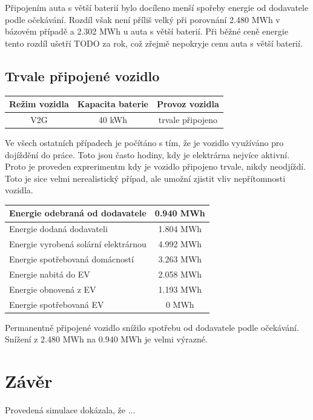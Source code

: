 \documentclass[12pt,a4paper]{article}
\begin{document}
Připojením auta s větší baterií bylo docíleno menší spořeby energie od dodavatele podle očekávání.
Rozdíl však není příliš velký při porovnání 2.480 MWh v bázovém případě a
2.302 MWh u auta s větší baterií.
Při běžné ceně energie tento rozdíl ušetří TODO za rok, což zřejmě nepokryje cenu auta s větší baterií.


\subsection{Trvale připojené vozidlo}

\bigskip
\begin{tabular}{ | c | c | c | }
\hline
Režim vozidla & Kapacita baterie & Provoz vozidla \\
\hline
V2G & 40 kWh & trvale připojeno \\
\hline
\end{tabular}
\bigskip

Ve všech ostatních případech je počítáno s tím, že je vozidlo využíváno pro dojíždění do práce.
Toto jsou často hodiny, kdy je elektrárna nejvíce aktivní.
Proto je proveden exprerimentm kdy je vozidlo připojeno trvale, nikdy neodjíždí.
Toto je sice velmi nerealistický případ, ale umožní zjistit vliv nepřítomnosti vozidla.

\bigskip
\begin{tabular}{ | l | c | }
\hline
Energie odebraná od dodavatele & 0.940 MWh \\
\hline
Energie dodaná dodavateli & 1.804 MWh \\
\hline
Energie vyrobená solární elektrárnou & 4.992 MWh \\
\hline
Energie spotřebovaná domácností & 3.263 MWh \\
\hline
Energie nabitá do EV & 2.058 MWh \\
\hline
Energie obnovená z EV & 1.193 MWh \\
\hline
Energie spotřebovaná EV & 0 MWh \\
\hline
\end{tabular}
\bigskip

Permanentně připojené vozidlo snížilo spotřebu od dodavatele podle očekávání.
Snížení z 2.480 MWh na 0.940 MWh je velmi výrazné.


\section{Závěr}

Provedená simulace dokázala, že ...

\printbibliography
\end{document}
